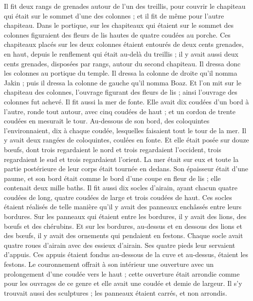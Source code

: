 \begin{multicols}{2}
Il fit deux rangs de grenades autour de l'un des treillis, pour couvrir le chapiteau qui était sur le sommet d'une des colonnes ; et il fit de même pour l'autre chapiteau.
Dans le portique, sur les chapiteaux qui étaient sur le sommet des colonnes figuraient des fleurs de lis hautes de quatre coudées au porche.
Ces chapiteaux placés sur les deux colonnes étaient entourés de deux cents grenades, en haut, depuis le renflement qui était au-delà du treillis ; il y avait aussi deux cents grenades, disposées par rangs, autour du second chapiteau.
Il dressa donc les colonnes au portique du temple. Il dressa la colonne de droite qu'il nomma Jakin ; puis il dressa la colonne de gauche qu'il nomma Boaz.
Et l'on mit sur le chapiteau des colonnes, l'ouvrage figurant des fleurs de lis ; ainsi l'ouvrage des colonnes fut achevé.
Il fit aussi la mer de fonte. Elle avait dix coudées d'un bord à l'autre, ronde tout autour, avec cinq coudées de haut ; et un cordon de trente coudées en mesurait le tour.
Au-dessous de son bord, des coloquintes l'environnaient, dix à chaque coudée, lesquelles faisaient tout le tour de la mer. Il y avait deux rangées de coloquintes, coulées en fonte.
Et elle était posée sur douze bœufs, dont trois regardaient le nord et trois regardaient l'occident, trois regardaient le sud et trois regardaient l'orient. La mer était sur eux et toute la partie postérieure de leur corps était tournée en dedans.
Son épaisseur était d'une paume, et son bord était comme le bord d'une coupe en fleur de lis ; elle contenait deux mille baths.
Il fit aussi dix socles d'airain, ayant chacun quatre coudées de long, quatre coudées de large et trois coudées de haut.
Ces socles étaient réalisés de telle manière qu'il y avait des panneaux enchâssés entre leurs bordures.
Sur les panneaux qui étaient entre les bordures, il y avait des lions, des bœufs et des chérubins. Et sur les bordures, au-dessus et en dessous des lions et des bœufs, il y avait des ornements qui pendaient en festons.
Chaque socle avait quatre roues d'airain avec des essieux d'airain. Ses quatre pieds leur servaient d'appuis. Ces appuis étaient fondus au-dessous de la cuve et au-dessus, étaient les festons.
Le couronnement offrait à son intérieur une ouverture avec un prolongement d'une coudée vers le haut ; cette ouverture était arrondie comme pour les ouvrages de ce genre et elle avait une coudée et demie de largeur. Il s'y trouvait aussi des sculptures ; les panneaux étaient carrés, et non arrondis.

\end{multicols}
